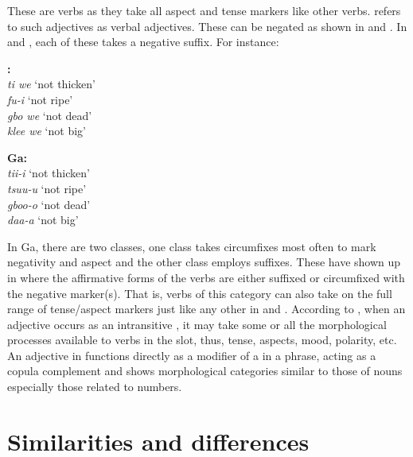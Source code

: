 \documentclass[output=paper,
modfonts
]{langscibook}
\begin{document}
These are verbs as they take all aspect and tense markers like other verbs. \citet{Dixon2004} refers to such adjectives as verbal adjectives. These can be negated as shown in  and . In  and , each of these takes a negative suffix. For instance:

\parbox{.4\textwidth}{
\ea\label{ex:caesar:52}
\textbf{:}\\
\textit{ti we} ‘not thicken’   \\
\textit{fu-i} ‘not ripe’  \\
\textit{gbo we} ‘not dead’   \\
\textit{klee we} ‘not big’  
\z
}
\parbox{.4\textwidth}{
\ea\label{ex:caesar:53}
\textbf{Ga:}\\
\textit{tii-i} ‘not thicken’ \\
\textit{tsuu-u} ‘not ripe’ \\
\textit{gboo-o}  ‘not dead’ \\
\textit{daa-a} ‘not big’ 
\z
}

In Ga, there are two  classes, one class takes circumfixes most often to mark negativity and aspect and the other class employs suffixes. These have shown up in  where the affirmative forms of the verbs are either suffixed or circumfixed with the negative marker(s). That is, verbs of this category can also take on the full range of tense/aspect markers just like any other  in  and . According to \citet[19]{Dixon2004}, when an adjective occurs as an intransitive , it may take some or all the morphological processes available to verbs in the slot, thus, tense, aspects, mood, polarity, etc. An adjective in  functions directly as a modifier of a  in a  phrase, acting as a copula complement and shows morphological categories similar to those of nouns especially those related to numbers.


\section{Similarities and differences}\label{sec:caesar:4.4} 
\end{document}
